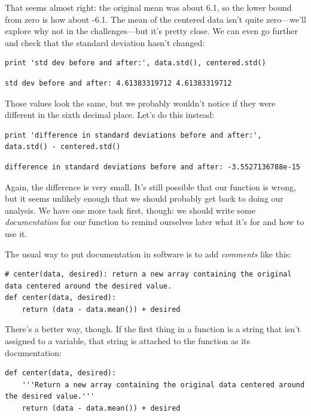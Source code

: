 \documentclass[]{book}
\newcommand{\gdef}[2]{\emph{#2}}
\begin{document}
That seems almost right: the original mean was about 6.1, so the lower
bound from zero is how about -6.1. The mean of the centered data isn't
quite zero---we'll explore why not in the challenges---but it's pretty
close. We can even go further and check that the standard deviation
hasn't changed:

\begin{verbatim}
print 'std dev before and after:', data.std(), centered.std()
\end{verbatim}

\begin{verbatim}
std dev before and after: 4.61383319712 4.61383319712
\end{verbatim}

Those values look the same, but we probably wouldn't notice if they were
different in the sixth decimal place. Let's do this instead:

\begin{verbatim}
print 'difference in standard deviations before and after:', data.std() - centered.std()
\end{verbatim}

\begin{verbatim}
difference in standard deviations before and after: -3.5527136788e-15
\end{verbatim}

Again, the difference is very small. It's still possible that our
function is wrong, but it seems unlikely enough that we should probably
get back to doing our analysis. We have one more task first, though: we
should write some \gdef{g:documentation}{documentation} for our
function to remind ourselves later what it's for and how to use it.

The usual way to put documentation in software is to add
\gdef{g:comment}{comments} like this:

\begin{verbatim}
# center(data, desired): return a new array containing the original data centered around the desired value.
def center(data, desired):
    return (data - data.mean()) + desired
\end{verbatim}

There's a better way, though. If the first thing in a function is a
string that isn't assigned to a variable, that string is attached to the
function as its documentation:

\begin{verbatim}
def center(data, desired):
    '''Return a new array containing the original data centered around the desired value.'''
    return (data - data.mean()) + desired
\end{verbatim}
\end{document}
